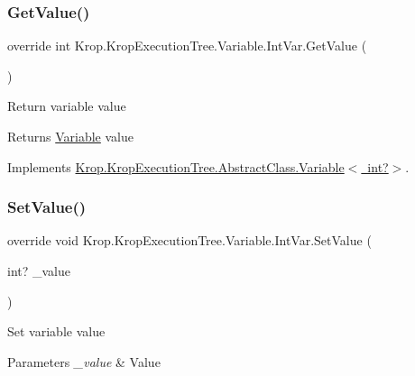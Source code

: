 \subsubsection{\texorpdfstring{Get\+Value()}{GetValue()}}
{\footnotesize\ttfamily override int Krop.\+Krop\+Execution\+Tree.\+Variable.\+Int\+Var.\+Get\+Value (\begin{DoxyParamCaption}{ }\end{DoxyParamCaption})\hspace{0.3cm}{\ttfamily [virtual]}}



Return variable value 

\begin{DoxyReturn}{Returns}
\mbox{\hyperlink{namespace_krop_1_1_krop_execution_tree_1_1_variable}{Variable}} value
\end{DoxyReturn}


Implements \mbox{\hyperlink{class_krop_1_1_krop_execution_tree_1_1_abstract_class_1_1_variable_a9d77d99b187893c15c5847ffa6fe0daf}{Krop.\+Krop\+Execution\+Tree.\+Abstract\+Class.\+Variable$<$ int?$>$}}.

\mbox{\label{class_krop_1_1_krop_execution_tree_1_1_variable_1_1_int_var_a437c24097ebfe4173e39880e76eb7d8b}} 
\subsubsection{\texorpdfstring{Set\+Value()}{SetValue()}}
{\footnotesize\ttfamily override void Krop.\+Krop\+Execution\+Tree.\+Variable.\+Int\+Var.\+Set\+Value (\begin{DoxyParamCaption}\item[{int?}]{\+\_\+value }\end{DoxyParamCaption})}



Set variable value 


\begin{DoxyParams}{Parameters}
{\em \+\_\+value} & Value\\
\hline
\end{DoxyParams}
\mbox{\label{class_krop_1_1_krop_execution_tree_1_1_variable_1_1_int_var_acfe213da1e8d6fb0590872d3e7f9195b}} 
